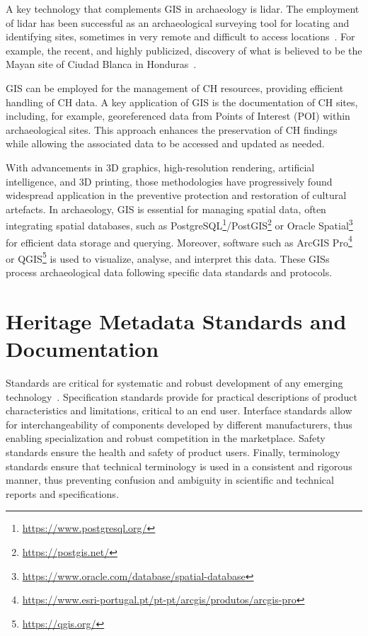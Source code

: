 A key technology that complements \gls{GIS} in archaeology is \gls{lidar}. 
The employment of \gls{lidar} has been successful as an archaeological surveying tool for locating and identifying
sites, sometimes in very remote and difficult to access locations~\cite{article_lidar}. For example, the recent, and highly publicized, 
discovery of what is believed to be the Mayan site of Ciudad Blanca in Honduras~\cite{Tolley2012}.

\gls{GIS} can be employed for the management of \gls{CH} resources, providing efficient handling of \gls{CH} data. A key application of GIS is the documentation of \gls{CH} sites, including, for example, georeferenced data from Points of Interest (\gls{POI}) within archaeological sites. This approach enhances the preservation of \gls{CH} findings while allowing the associated data to be accessed and updated as needed.

With advancements in \gls{3D} graphics, high-resolution rendering, artificial intelligence, and \gls{3D} printing, those methodologies have progressively found widespread application in the preventive protection and restoration of cultural artefacts. 
In archaeology, \gls{GIS} is essential for managing spatial data, often integrating spatial databases, such as PostgreSQL\footnote{\url{https://www.postgresql.org/}}/PostGIS\footnote{\url{https://postgis.net/}} or Oracle Spatial\footnote{\url{https://www.oracle.com/database/spatial-database}} for efficient data storage and querying.
Moreover, software such as ArcGIS Pro\footnote{\url{https://www.esri-portugal.pt/pt-pt/arcgis/produtos/arcgis-pro}} or QGIS\footnote{\url{https://qgis.org/}} is used to visualize, analyse, and interpret this data. These \glspl{GIS} process archaeological data following specific data standards and protocols.

\section{Heritage Metadata Standards and Documentation} 
\label{sub:standart}

Standards are critical for systematic and robust development of any emerging technology~\cite{hale2014handbook}.
Specification standards provide for practical descriptions of product characteristics and limitations, 
critical to an end user. Interface standards allow for interchangeability of components developed by 
different manufacturers, thus enabling specialization and robust competition in the marketplace. 
Safety standards ensure the health and safety of product users. Finally, terminology standards ensure that 
technical terminology is used in a consistent and rigorous manner, thus preventing confusion and 
ambiguity in scientific and technical reports and specifications.

